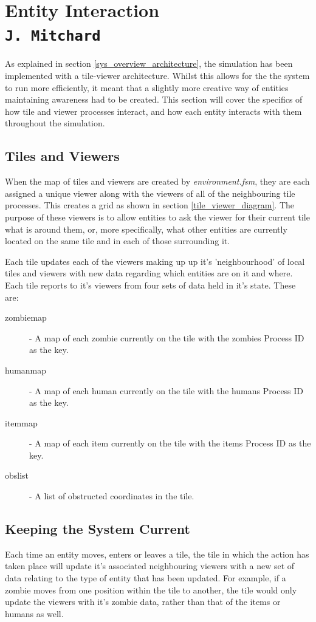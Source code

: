 \pagestyle{empty}
\section{Entity Interaction\\{\small\tt J.~Mitchard}}
As explained in section \ref{sys_overview_architecture}, the simulation has been implemented with a tile-viewer architecture. Whilst this allows for the the system to run more efficiently, it meant that a slightly more creative way of entities maintaining awareness had to be created. This section will cover the specifics of how tile and viewer processes interact, and how each entity interacts with them throughout the simulation.

\subsection{Tiles and Viewers}
When the map of tiles and viewers are created by \emph{environment.fsm}, they are each assigned a unique viewer along with the viewers of all of the neighbouring tile processes. This creates a grid as shown in section \ref{tile_viewer_diagram}. The purpose of these viewers is to allow entities to ask the viewer for their current tile what is around them, or, more specifically, what other entities are currently located on the same tile and in each of those surrounding it.

Each tile updates each of the viewers making up up it's 'neighbourhood' of local tiles and viewers with new data regarding which entities are on it and where. Each tile reports to it's viewers from four sets of data held in it's state. These are:
\begin{description}
  \item[zombie\textunderscore map] - A map of each zombie currently on the tile with the zombies Process ID as the key.
  \item[human\textunderscore map] - A map of each human currently on the tile with the humans Process ID as the key.
  \item[item\textunderscore map] - A map of each item currently on the tile with the items Process ID as the key.
  \item[obs\textunderscore list] - A list of obstructed coordinates in the tile.
\end{description}

\subsection{Keeping the System Current}
Each time an entity moves, enters or leaves a tile, the tile in which the action has taken place will update it's associated neighbouring viewers with a new set of data relating to the type of entity that has been updated. For example, if a zombie moves from one position within the tile to another, the tile would only update the viewers with it's zombie data, rather than that of the items or humans as well.

